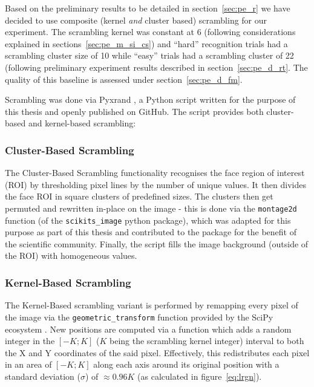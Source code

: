 	    Based on the preliminary results to be detailed in section~\ref{sec:pe_r} we have decided to use composite (kernel \textit{and} cluster based) scrambling for our experiment.
	    The scrambling kernel was constant at \SI{6}{\pixel} (following considerations explained in sections~\ref{sec:pe_m_si_cs}) 
	    and “hard” recognition trials had a scrambling cluster size of \SI{10}{\pixel} while “easy” trials had a scrambling cluster of \SI{22}{\pixel} (following preliminary experiment results described in section~\ref{sec:pe_d_rt}.
	    The quality of this baseline is assessed under section~\ref{sec:pe_d_fm}.
	    
	    Scrambling was done via Pyxrand \citep{pyxrand}, a Python script written for the purpose of this thesis and openly published on GitHub.
	    The script provides both cluster-based and kernel-based scrambling:
	    \subsubsection{Cluster-Based Scrambling}\label{sec:m_vs_si_cs}
		The Cluster-Based Scrambling functionality recognises the face region of interest (ROI) by thresholding pixel lines by the number of unique values.
		It then divides the face ROI in square clusters of predefined sizes.
		The clusters then get permuted and rewritten in-place on the image - this is done via the \colorbox{vlg}{\texttt{montage2d}} function (of the \colorbox{vlg}{\texttt{scikits\_image}} python package), which  was adapted for this purpose as part of this thesis and contributed to the package for the benefit of the scientific community.
		Finally, the script fills the image background (outside of the ROI) with homogeneous values.
	    \subsubsection{Kernel-Based Scrambling}\label{sec:m_vs_si_ks}
		The Kernel-Based scrambling variant is performed by remapping every pixel of the image via the \colorbox{vlg}{\texttt{geometric\_transform}} function provided by the SciPy ecosystem \citep{scipy,Oliphant2007}.
		New positions are computed via a function which adds a random integer in the $[-K;K]$ ($K$ being the scrambling kernel integer) interval to both the X and Y coordinates of the said pixel.
		Effectively, this redistributes each pixel in an area of $[-K;K]$ along each axis around its original position with a standard deviation ($\sigma$) of $\approx 0.96K$ (as calculated in figure~\ref{eq:lrgn}).
    
